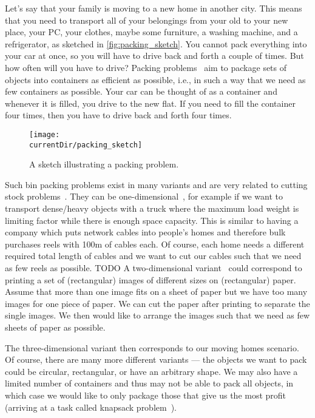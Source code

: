 %
%
Let's say that your family is moving to a new home in another city.
This means that you need to transport all of your belongings from your old to your new place, your PC, your clothes, maybe some furniture, a washing machine, and a refrigerator, as sketched in \autoref{fig:packing_sketch}.
You cannot pack everything into your car at once, so you will have to drive back and forth a couple of times.
But how often will you have to drive?
Packing problems~\cite{S2018ITCAPOPMASM,DF1992CAPIPADATAB} aim to package sets of objects into containers as efficient as possible, i.e., in such a way that we need as few containers as possible.
Your car can be thought of as a container and whenever it is filled, you drive to the new flat.
If you need to fill the container four times, then you have to drive back and forth four times.%
%
\begin{figure}%
\centering%
\texttt{[image: \\currentDir/packing\_sketch]}%
\caption{A sketch illustrating a packing problem.}%
\label{fig:packing_sketch}%
\end{figure}

Such bin packing problems exist in many variants and are very related to cutting stock problems~\cite{DF1992CAPIPADATAB}.
They can be one-dimensional~\cite{DIM2016BPACSPMMAEA}, for example if we want to transport dense/heavy objects with a truck where the maximum load weight is limiting factor while there is enough space capacity.
This is similar to having a company which puts network cables into people's homes and therefore bulk purchases reels with 100m of cables each.
Of course, each home needs a different required total length of cables and we want to cut our cables such that we need as few reels as possible.
TODO
A two-dimensional variant~\cite{LMM2002TDPPAS} could correspond to printing a set of (rectangular) images of different sizes on (rectangular) paper.
Assume that more than one image fits on a sheet of paper but we have too many images for one piece of paper.
We can cut the paper after printing to separate the single images.
We then would like to arrange the images such that we need as few sheets of paper as possible.

The three-dimensional variant then corresponds to our moving homes scenario.
Of course, there are many more different variants --- the objects we want to pack could be circular, rectangular, or have an arbitrary shape.
We may also have a limited number of containers and thus may not be able to pack all objects, in which case we would like to only package those that give us the most profit (arriving at a task called knapsack problem~\cite{MT1990KPAACI}).%
%
\endhsection%
%
